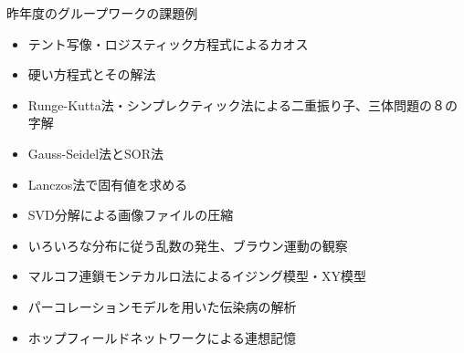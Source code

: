 \documentclass[dvipdfmx]{beamer}
\begin{document}
\begin{frame}[t,fragile]{昨年度のグループワークの課題例}
  \begin{itemize}
  \item テント写像・ロジスティック方程式によるカオス
  \item 硬い方程式とその解法
  \item Runge-Kutta法・シンプレクティック法による二重振り子、三体問題の８の字解
  \item Gauss-Seidel法とSOR法
  \item Lanczos法で固有値を求める
  \item SVD分解による画像ファイルの圧縮
  \item いろいろな分布に従う乱数の発生、ブラウン運動の観察
  \item マルコフ連鎖モンテカルロ法によるイジング模型・XY模型
  \item パーコレーションモデルを用いた伝染病の解析
  \item ホップフィールドネットワークによる連想記憶
  \end{itemize}
\end{frame}
\end{document}
